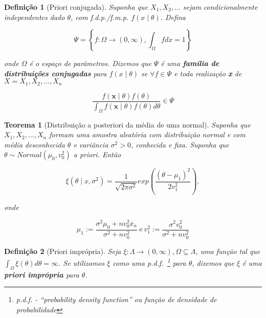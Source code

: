 \documentclass{article}
\newtheorem{theorem}{Teorema}
\newtheorem{definition}{Definição}
\begin{document}
	\begin{definition}[Priori conjugada]
		Suponha que $X_1, X_2, \ldots$ sejam condicionalmente independentes dado $\theta$, com f.d.p./f.m.p. $f(x\mid\theta)$. Defina
		
		\begin{equation}
			\Psi = \left \{ f: \Omega \rightarrow (0, \infty), \int_\Omega f dx = 1 \right \}
		\end{equation}
		
		onde $\Omega$ é o espaço de parâmetros. Dizemos que $\Psi$ é uma \textbf{família de distribuições conjugadas} para $f(x \mid \theta)$ se $\forall f \in \Psi$ e toda realização \textbf{x} de $X = X_1, X_2, \ldots, X_n$
		
		\begin{equation}
			\frac{f(\textbf{x} \mid \theta) f(\theta)}{\int_\Omega f(\textbf{x} \mid \theta)f(\theta) d \theta} \in \Psi
		\end{equation}
	\end{definition}
	
	\begin{theorem}[Distribuição a posteriori da média de uma normal]
		Suponha que $X_1, X_2, \ldots, X_n$ formam uma amostra aleatória com distribuição normal e com média desconhecida $\theta$ e variância $\sigma^2 > 0$, conhecida e fixa. Suponha que $\theta \sim Normal(\mu_0, v_0^2)$ a priori. Então
		
		\begin{equation}
			\xi (\theta \mid x, \sigma^2) = \frac{1}{\sqrt{2 \pi \sigma^2}} exp \left (\frac{(\theta - \mu_1)^2}{2v_1^2}\right ),
		\end{equation}
		
		onde
		
		\begin{equation}
			\mu_1 := \frac{\sigma^2 \mu_0 + n v_0^2 \overline{x}_n}{\sigma^2 + n v_ 0^2} \ \mathrm{e} \ v_1^2 := \frac{\sigma^2 v_0^2}{\sigma^2 + n v_0^2}
		\end{equation}
	\end{theorem}
	
	\begin{definition}[Priori imprópria]
		Seja $\xi : \Lambda \rightarrow (0, \infty), \Omega \subseteq \Lambda$, uma função tal que $\int_\Omega \xi(\theta) d \theta = \infty$. Se utilizamos $\xi$ como uma p.d.f.~\footnote{p.d.f. - ``probability density function'' ou função de densidade de probabilidade} para $\theta$, dizemos que $\xi$ é uma \textbf{priori imprópria} para $\theta$.
	\end{definition}
	
\end{document}

